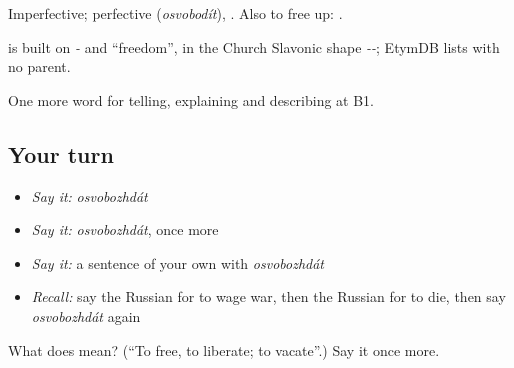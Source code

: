 Imperfective; perfective \emph{} (\emph{osvobodít}), \emph{}. Also to free up: \emph{ }.

\begin{cousinweb}
\emph{} is built on \emph{-} and \emph{} \textquotedblleft{}freedom\textquotedblright{}, in the Church Slavonic shape \emph{--}; EtymDB lists \emph{} with no parent.
\end{cousinweb}

\begin{grammarlens}[title={What you've built}]
One more word for telling, explaining and describing at B1.
\end{grammarlens}

\subsection*{Your turn}
\begin{itemize}
\raggedright
  \item \emph{Say it:} \emph{osvobozhdát}
  \item \emph{Say it:} \emph{osvobozhdát}, once more
  \item \emph{Say it:} a sentence of your own with \emph{osvobozhdát}
  \item \emph{Recall:} say the Russian for to wage war, then the Russian for to die, then say \emph{osvobozhdát} again
\end{itemize}

\begin{tcolorbox}[breakable,colback=teal!4,colframe=teal!35!black,title={Before you move on}]
What does  mean? (\textquotedblleft{}To free, to liberate; to vacate\textquotedblright{}.) Say it once more.
\end{tcolorbox}
